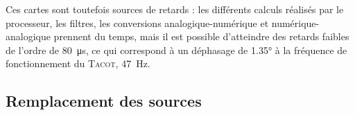 Ces cartes sont toutefois sources de retards : les différents calculs réalisés par le processeur, les filtres, les conversions analogique-numérique et numérique-analogique prennent du temps, mais il est possible d'atteindre des retards faibles de l'ordre de \qty{80}{\micro\second}, ce qui correspond à un déphasage de \ang{1.35} à la fréquence de fonctionnement du \textsc{Tacot}, \qty{47}{\hertz}.
\subsection{Remplacement des sources}
